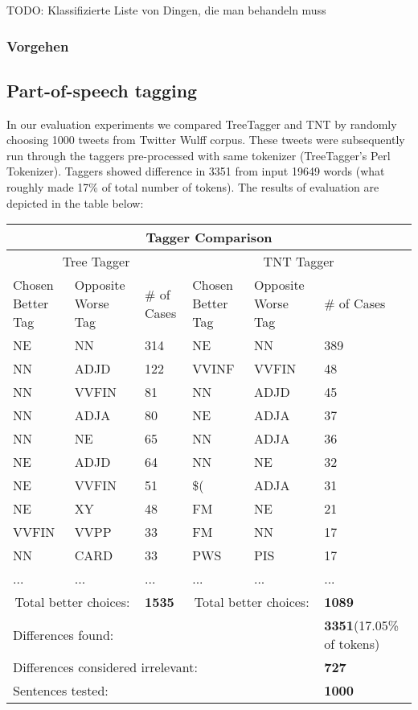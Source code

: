 \documentclass[11pt]{article}
\begin{document}
TODO: Klassifizierte Liste von Dingen, die man behandeln muss

\subsubsection{Vorgehen}


\subsection{Part-of-speech tagging}

In our evaluation experiments we compared TreeTagger and TNT by randomly choosing 1000 tweets from Twitter Wulff corpus. These tweets were subsequently run through the taggers pre-processed with same tokenizer (TreeTagger's Perl Tokenizer). Taggers showed difference in 3351 from input 19649 words (what roughly made 17\% of total number of tokens). The results of evaluation are depicted in the table below:

\begin{tabular}{|*{6}{p{}|}}\hline
\multicolumn{6}{|c|}{Tagger Comparison}\\\hline\hline
\multicolumn{3}{|c|}{Tree Tagger}&\multicolumn{3}{c|}{TNT Tagger}\\\hline
Chosen Better Tag&Opposite Worse Tag & \# of Cases & Chosen Better Tag & Opposite Worse Tag & \# of Cases\\\hline
NE & NN & 314 & NE & NN & 389\\
NN & ADJD & 122 & VVINF & VVFIN & 48\\
NN & VVFIN & 81 & NN & ADJD & 45\\
NN & ADJA & 80 & NE & ADJA & 37\\
NN & NE & 65 & NN & ADJA & 36\\
NE & ADJD & 64 & NN & NE & 32\\
NE & VVFIN & 51 & \$( & ADJA & 31\\
NE & XY & 48 & FM & NE & 21\\
VVFIN & VVPP & 33 & FM & NN & 17\\
NN & CARD & 33 & PWS & PIS & 17\\
... & ... & ... & ... & ... & ...\\

\multicolumn{2}{|c|}{Total better choices:} & \textbf{1535} & \multicolumn{2}{|c|}{Total better choices:} & \textbf{1089}\\\hline\hline
\multicolumn{5}{|l|}{Differences found:}& \textbf{3351}\newline \small{(17.05\% of tokens)}\\\hline
\multicolumn{5}{|l|}{Differences considered irrelevant:}& \textbf{727}\\\hline
\multicolumn{5}{|l|}{Sentences tested:}& \textbf{1000}\\\hline
\end{tabular}
\end{document}

